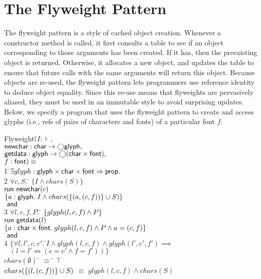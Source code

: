 \documentclass[preprint,natbib]{sigplanconf}
\begin{document}
\section{The Flyweight Pattern}
The flyweight pattern is a style of cached object creation. Whenever a
constructor method is called, it first consults a table to see if an
object corresponding to those arguments has been created. If it has,
then the preexisting object is returned.  Otherwise, it allocates a
new object, and updates the table to ensure that future calls with the same
arguments will return this object. Because objects are re-used, the
flyweight pattern lets programmers use reference identity to deduce
object equality. Since this re-use means that flyweights are
pervasively aliased, they must be used in an immutable style to avoid
surprising updates.
%
%
Below, we specify a program that uses the flyweight pattern to create
and access glyphs (i.e., refs of pairs of characters and fonts)
of a particular font $f$.  
{\small
\begin{tabbing}
Flyweight$($\=$I : \assert,\;\; $\\
\> $\mbox{\textsf{{newchar}}} : \mbox{\textsf{{char}}} \to \bigcirc{\mbox{\textsf{{glyph}}}},$ \\
\> $\mbox{\textsf{{getdata}}} : \mbox{\textsf{{glyph}}} \to \bigcirc{(\mbox{\textsf{{char}}}\times \mbox{\textsf{{font}}})},$ \\
\> $f:\mbox{\textsf{{font}}}) \equiv$ \\
1 \qquad \=$\exists $\=$glyph : \mbox{\textsf{{glyph}}} \times \mbox{\textsf{{char}}} \times \mbox{\textsf{{font}}} \Rightarrow \mbox{\textsf{{prop}}}.$ 
\\[0.5em]

2  \> \> $\forall c, S.\;$\=
         $\{I \land chars(S)\}$ \\
   \>\>\>$\mbox{\textsf{{run }}}{\mbox{\textsf{{newchar}}}(c)}$ \\
   \>\>\>$\{{a:\mbox{\textsf{{glyph}}}.\; 
                 I \land chars(\{{(a, (c,f))}\} \cup S)}\}$ \\
  \> \!$\mbox{\textsf{{ and }}}$ \\
3 \> $\forall l, c, f, P.\;$\=
     $\{{glyph(l, c, f) \land P}\}$ \\
\>\> $\mbox{\textsf{{run }}}{\mbox{\textsf{{getdata}}}(l)}$ \\
\>\> $\{{a:\mbox{\textsf{{char}}} \times \mbox{\textsf{{font}}}.\; glyph(l, c, f) \land P \land a = (c,f)}\}$
\\
  \> \!$\mbox{\textsf{{ and }}}$ \\
4 \> $\{\forall l, l', c, c'.\;$\=$I \land glyph(l,c,f) \land glyph(l',c',f')
 \implies $ \\
\>\>  $\;\;\;\left(l = l' \iff (c = c'\land f=f')\right)\}$ \\[0.5em]

$chars(\emptyset)$ \qquad\qquad\qquad \;\;\= $\equiv$ \= $\top$ \\
$chars(\{{(l,(c,f))}\} \cup S)$ \> $\equiv$ \> $glyph(l,c,f) \land chars(S)$ \\
\end{tabbing}
}
\end{document}
